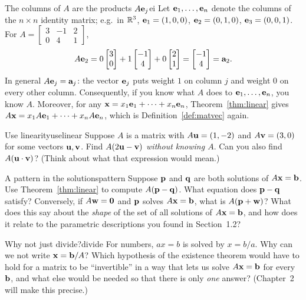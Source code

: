 \documentclass[11pt]{article}
\begin{document}
\begin{exmp}{The columns of $A$ are the products $A\mathbf{e}_j$}{ei}
Let $\mathbf{e}_1,\dots,\mathbf{e}_n$ denote the columns of the $n\times n$ identity matrix; e.g.\ in $\mathbb{R}^3$, $\mathbf{e}_1=(1,0,0)$, $\mathbf{e}_2=(0,1,0)$, $\mathbf{e}_3=(0,0,1)$.
For $A=\begin{bmatrix}3&-1&2\\0&4&1\end{bmatrix}$,
\[
A\mathbf{e}_2=0\begin{bmatrix}3\\0\end{bmatrix}+1\begin{bmatrix}-1\\4\end{bmatrix}+0\begin{bmatrix}2\\1\end{bmatrix}=\begin{bmatrix}-1\\4\end{bmatrix}=\mathbf{a}_2.
\]
In general $A\mathbf{e}_j=\mathbf{a}_j$: the vector $\mathbf{e}_j$ puts weight $1$ on column $j$ and weight $0$ on every other column. Consequently, if you know
what $A$ does to $\mathbf{e}_1,\dots,\mathbf{e}_n$, you know $A$. Moreover, for any $\mathbf{x}=x_1\mathbf{e}_1+\cdots+x_n\mathbf{e}_n$, Theorem~\ref{thm:linear} gives
$A\mathbf{x}=x_1A\mathbf{e}_1+\cdots+x_nA\mathbf{e}_n$, which is Definition~\ref{def:matvec} again.
\end{exmp}
 
\begin{kc}{Use linearity}{uselinear}
Suppose $A$ is a matrix with $A\mathbf{u}=(1,-2)$ and $A\mathbf{v}=(3,0)$ for some vectors $\mathbf{u},\mathbf{v}$. Find $A(2\mathbf{u}-\mathbf{v})$ \emph{without knowing $A$}. Can you also find $A(\mathbf{u}\cdot\mathbf{v})$?
(Think about what that expression would mean.)
\end{kc}
 
\begin{think}{A pattern in the solutions}{pattern}
Suppose $\mathbf{p}$ and $\mathbf{q}$ are both solutions of $A\mathbf{x}=\mathbf{b}$. Use Theorem~\ref{thm:linear} to compute $A(\mathbf{p}-\mathbf{q})$. What equation does
$\mathbf{p}-\mathbf{q}$ satisfy? Conversely, if $A\mathbf{w}=\mathbf{0}$ and $\mathbf{p}$ solves $A\mathbf{x}=\mathbf{b}$, what is $A(\mathbf{p}+\mathbf{w})$? What does this say about the
\emph{shape} of the set of all solutions of $A\mathbf{x}=\mathbf{b}$, and how does it relate to the parametric descriptions you found in Section~1.2?
\end{think}
 
\begin{think}{Why not just divide?}{divide}
For numbers, $ax=b$ is solved by $x=b/a$. Why can we not write $\mathbf{x}=\mathbf{b}/A$? Which hypothesis of the existence theorem would have to hold for a matrix to be
``invertible'' in a way that lets us solve $A\mathbf{x}=\mathbf{b}$ for every $\mathbf{b}$, and what else would be needed so that there is only \emph{one} answer? (Chapter~2 will make this precise.)
\end{think}
 
\end{document}
